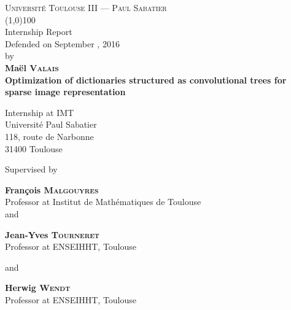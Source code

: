 \begin{titlepage}
\thispagestyle{titlepage}
\begin{center}
\textsc{Université Toulouse III — Paul Sabatier}\\
\vspace{0.5 cm}
\line(1,0){100}\\
\vspace{0.6 cm}
{{{Internship Report}}}\\
\vspace{0.3cm}
Defended on September , 2016\\ \vspace{0.3 cm} by\\ \vspace{0.3 cm} \textbf{Maël \textsc{Valais}}\\
\vfill
{\Huge \textbf{Optimization of dictionaries structured as convolutional trees for sparse image representation }}\\
\vfill

{{Internship at \acs{IMT}}}\\
{Université Paul Sabatier}\\
{118, route de Narbonne}\\
{31400 Toulouse}\\
\vspace{2 cm}

\par Supervised by
\vspace{0.5cm}
\par \textbf{François \textsc{Malgouyres}}\\
Professor at Institut de Mathématiques de Toulouse\\ 

\vspace{0.2cm} and \vspace{0.2cm}

\textbf{Jean-Yves \textsc{Tourneret}}\\
Professor at ENSEIHHT, Toulouse

\vspace{0.2cm} and \vspace{0.2cm}

\textbf{Herwig \textsc{Wendt}}\\
Professor at ENSEIHHT, Toulouse

\end{center}
\end{titlepage}

\pagestyle{empty}
\restoregeometry

\tableofcontents


\pagestyle{body}